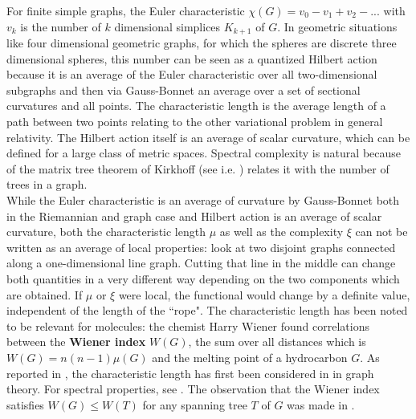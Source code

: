 \documentclass[12pt]{amsart}
\theoremstyle{definition}
\begin{document}
For finite simple graphs, the Euler characteristic $\chi(G) = v_0-v_1+v_2-...$ 
with $v_k$ is the number of $k$ dimensional simplices $K_{k+1}$ of $G$. In geometric
situations like four dimensional geometric graphs, for which the spheres are discrete three dimensional 
spheres, this number can be seen as a quantized Hilbert action \cite{eveneuler} because it is an 
average of the Euler characteristic over all two-dimensional subgraphs and then via Gauss-Bonnet 
an average over a set of sectional curvatures and all points. 
The characteristic length is the average length of a path between two points relating 
to the other variational problem in general relativity. 
The Hilbert action itself is an average of scalar curvature, which can be 
defined for a large class of metric spaces. Spectral complexity
is natural because of the matrix tree theorem of Kirkhoff (see i.e. \cite{Biggs} )
relates it with the number of trees in a graph.  \\

While the Euler characteristic is an average of curvature by Gauss-Bonnet both in the Riemannian 
and graph case \cite{cherngaussbonnet} and Hilbert action is an average of scalar curvature, 
both the characteristic length $\mu$ as well as the complexity $\xi$ can not be written 
as an average of local properties: look at two disjoint graphs connected along a 
one-dimensional line graph. Cutting that line in the middle can change both quantities in a very different way 
depending on the two components which are obtained. If $\mu$
or $\xi$ were local, the functional would change by a definite value, independent of the length of the ``rope".
The characteristic length has been noted to be relevant for molecules: the chemist Harry Wiener found
correlations between the {\bf Wiener index} $W(G)$, the sum over all distances which is 
$W(G) = n(n-1) \mu(G)$ and the melting point of a hydrocarbon $G$. As reported in 
\cite{GoddardOellermann}, the characteristic length has first been considered in 
\cite{DoyleGraver1} in graph theory. For spectral properties, see \cite{Miegham}. 
The observation that the Wiener index satisfies $W(G) \leq W(T)$ 
for any spanning tree $T$ of $G$ was made in \cite{Schmuck}.  \\
\end{document}
